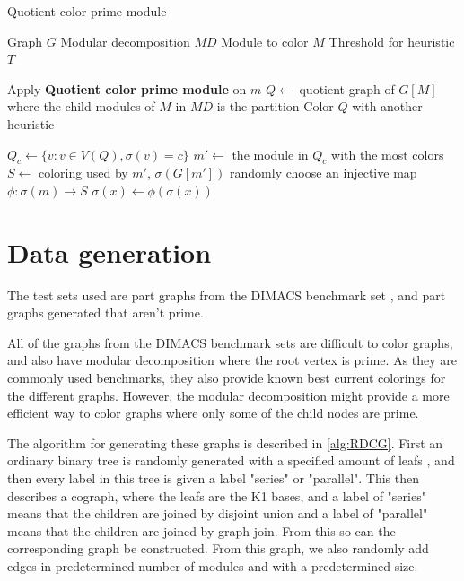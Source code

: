 \documentclass[a4paper]{article}
\begin{document}
\begin{algorithm}[H]
  \caption{Quotient color prime module}
  \begin{algorithmic}[1]
    \REQUIRE Graph $G$
    \REQUIRE Modular decomposition $MD$
    \REQUIRE Module to color $M$
    \REQUIRE Threshold for heuristic $T$

    \ENDIF
        \STATE Apply \textbf{Quotient color prime module} on $m$
    \ENDFOR
    \STATE $Q \leftarrow $ quotient graph of $G[M]$ where the child modules of $M$ in $MD$ is the partition
    \STATE Color $Q$ with another heuristic

        \STATE $Q_c \leftarrow \{ v : v \in V(Q), \sigma(v) = c\}$
        \STATE $m' \leftarrow$ the module in $Q_c$ with the most colors
        \STATE $S \leftarrow$ coloring used by $m'$, $\sigma(G[m'])$
            \STATE randomly choose an injective map $\phi:\sigma(m)\to S$
                \STATE $\sigma(x) \leftarrow \phi(\sigma(x))$
            \ENDFOR
        \ENDFOR
    \ENDFOR

  \end{algorithmic}
\end{algorithm}

\section{Data generation}
\label{sec:Data}

The test sets used are part graphs from the DIMACS benchmark set \cite{DIMACS}, 
and part graphs generated that aren't prime.

All of the graphs from the DIMACS benchmark sets are difficult to color graphs,
and also have modular decomposition where the root vertex is prime. As they are
commonly used benchmarks, they also provide known best current colorings for the
different graphs. However, the modular decomposition might provide a more
efficient way to color graphs where only some of the child nodes are prime. 

The algorithm for generating these graphs is described in \autoref{alg:RDCG}.
First an ordinary binary tree is randomly generated with a specified amount of
leafs , and then every label in this tree is given a label "series" or
"parallel".  This then describes a cograph, where the leafs are the K1 bases,
and a label of "series" means that the children are joined by disjoint union and
a label of "parallel" means that the children are joined by graph join.  From
this so can the corresponding graph be constructed. From this graph, we also
randomly add edges in predetermined number of modules and with a predetermined
size. 
\end{document}

